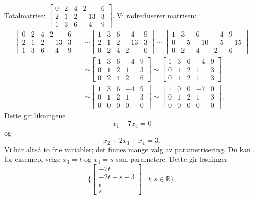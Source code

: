 \documentclass[titlepage,a4paper,12pt,norsk]{IMFeksamen}
\newcommand{\vvvv}[4]{\begin{bmatrix} #1 \\ #2 \\ #3 \\ #4 \end{bmatrix}}
\newcommand{\0}{\V{0}}
\begin{document}
\begin{oppgave}
Totalmatrise:
$
\begin{bmatrix}
0 & 2 & 4 &   2 & 6 \\
2 & 1 & 2 & -13 & 3 \\
1 & 3 & 6 &  -4 & 9
\end{bmatrix}
$.
Vi radreduserer matrisen:
\begin{align*}
\begin{bmatrix}
0 & 2 & 4 &   2 & 6 \\
2 & 1 & 2 & -13 & 3 \\
1 & 3 & 6 &  -4 & 9
\end{bmatrix}
&\sim 
\begin{bmatrix}
1 & 3 & 6 &  -4 & 9 \\
2 & 1 & 2 & -13 & 3 \\
0 & 2 & 4 &   2 & 6
\end{bmatrix}
\sim
\begin{bmatrix}
1 & 3 & 6 &  -4 & 9 \\
0 & -5 & -10 & -5 & -15 \\
0 & 2 & 4 &   2 & 6
\end{bmatrix}\\
&\sim 
\begin{bmatrix}
1 & 3 & 6 &  -4 & 9 \\
0 & 1 & 2 & 1 & 3 \\
0 & 2 & 4 &   2 & 6
\end{bmatrix}
\sim
\begin{bmatrix}
1 & 3 & 6 &  -4 & 9 \\
0 & 1 & 2 & 1 & 3 \\
0 & 1 & 2 & 1 & 3
\end{bmatrix}\\
&\sim 
\begin{bmatrix}
1 & 3 & 6 &  -4 & 9 \\
0 & 1 & 2 & 1 & 3 \\
0 & 0 & 0 &  0 & 0
\end{bmatrix}
\sim
\begin{bmatrix}
1 & 0 & 0 &  -7 & 0 \\
0 & 1 & 2 & 1 & 3 \\
0 & 0 & 0 &  0 & 0
\end{bmatrix}.
\end{align*}
Dette gir likningene 
$$x_1-7x_4=0$$
og $$x_2+2x_3+x_4=3.$$
Vi har altså to frie variabler; det finnes mange valg av parametrisering. Du kan for eksemepl velge $x_3=t$ og $x_4=s$ som parametere. Dette gir løsninger
$$\{\vvvv{-7t}{-2t-s+3}{t}{s}|\;\; t,s \in \mathbb{R}\}.$$
\end{oppgave}
\end{document}
